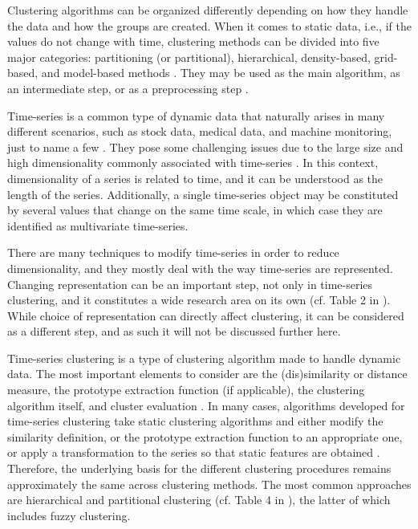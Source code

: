 Clustering algorithms can be organized differently depending on how they handle the data and how the groups are created.
When it comes to static data, i.e., if the values do not change with time,
clustering methods can be divided into five major categories:
partitioning (or partitional),
hierarchical,
density-based,
grid-based,
and model-based methods \citep{liao2005, rani2012}.
They may be used as the main algorithm,
as an intermediate step,
or as a preprocessing step \citep{aghabozorgi2015}.

Time-series is a common type of dynamic data that naturally arises in many different scenarios,
such as stock data,
medical data,
and machine monitoring,
just to name a few \citep{aghabozorgi2015, aggarwal2013}.
They pose some challenging issues due to the large size and high dimensionality commonly associated with time-series \citep{aghabozorgi2015}.
In this context,
dimensionality of a series is related to time,
and it can be understood as the length of the series.
Additionally, a single time-series object may be constituted by several values that change on the same time scale,
in which case they are identified as multivariate time-series.

There are many techniques to modify time-series in order to reduce dimensionality,
and they mostly deal with the way time-series are represented.
Changing representation can be an important step,
not only in time-series clustering,
and it constitutes a wide research area on its own (cf. Table 2 in \citet{aghabozorgi2015}).
While choice of representation can directly affect clustering,
it can be considered as a different step,
and as such it will not be discussed further here.

Time-series clustering is a type of clustering algorithm made to handle dynamic data.
The most important elements to consider are the (dis)similarity or distance measure,
the prototype extraction function (if applicable),
the clustering algorithm itself,
and cluster evaluation \citep{aghabozorgi2015}.
In many cases,
algorithms developed for time-series clustering take static clustering algorithms and either modify the similarity definition,
or the prototype extraction function to an appropriate one,
or apply a transformation to the series so that static features are obtained \citep{liao2005}.
Therefore, the underlying basis for the different clustering procedures remains approximately the same across clustering methods.
The most common approaches are hierarchical and partitional clustering (cf. Table 4 in \citet{aghabozorgi2015}),
the latter of which includes fuzzy clustering.

